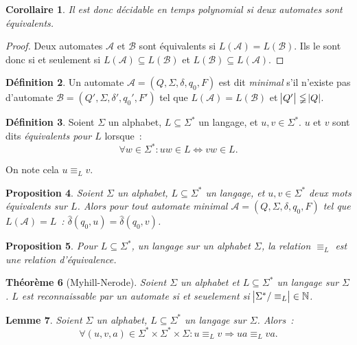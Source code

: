 \documentclass{article}
\newtheorem{thm}{Théorème}[section]
\newtheorem{prp}[thm]{Proposition}
\newtheorem{cor}[thm]{Corollaire}
\newtheorem{lem}[thm]{Lemme}
\theoremstyle{definition}
\newtheorem{déf}[thm]{Définition}
\theoremstyle{remark}
\newcommand{\N}{\mathbb N}
\newcommand{\automaton}{(Q, \Sigma, \delta, q_0, F)}
\begin{document}
	\begin{cor} Il est donc décidable en temps polynomial si deux automates sont équivalents.
	\end{cor}

	\begin{proof} Deux automates $\mathcal A$ et $\mathcal B$ sont équivalents si $L(\mathcal A) = L(\mathcal B)$. Ils le sont donc si et seulement si
	$L(\mathcal A) \subseteq L(\mathcal B)$ et $L(\mathcal B) \subseteq L(\mathcal A)$.
	\end{proof}

	\begin{déf} Un automate $\mathcal A = \automaton$ est dit \textit{minimal} s'il n'existe pas d'automate $\mathcal B = (Q', \Sigma, \delta', q_0', F')$
	tel que $L(\mathcal A) = L(\mathcal B)$ et $\abs {Q'} \lneqq \abs Q$.
	\end{déf}

	\begin{déf} Soient $\Sigma$ un alphabet, $L \subseteq \Sigma^*$ un langage, et $u, v \in \Sigma^*$. $u$ et $v$ sont dits \textit{équivalents pour $L$}
	lorsque~:
	\[\forall w \in \Sigma^* : uw \in L \iff vw \in L.\]

	On note cela $u \equiv_L v$.
	\end{déf}

	\begin{prp} Soient $\Sigma$ un alphabet, $L \subseteq \Sigma^*$ un langage, et $u, v \in \Sigma^*$ deux mots équivalents sur $L$.
	Alors pour tout automate minimal $\mathcal A = \automaton$ tel que $L(\mathcal A) = L$~: $\hat \delta(q_0, u) = \hat \delta(q_0, v)$.
	\end{prp}

	\begin{prp} Pour $L \subseteq \Sigma^*$, un langage sur un alphabet $\Sigma$, la relation $\equiv_L$ est une relation d'équivalence.
	\end{prp}

	\begin{thm}[Myhill-Nerode] Soient $\Sigma$ un alphabet et $L \subseteq \Sigma^*$ un langage sur $\Sigma$. $L$ est reconnaissable par un automate si et
	seuelement si $\abs {\Sigma^* / \equiv_L} \in \N$.
	\end{thm}

	\begin{lem}\label{lem:mots équivalents -> concaténations équivalentes} Soient $\Sigma$ un alphabet, $L \subseteq \Sigma^*$ un langage sur $\Sigma$. Alors~:
	\[\forall (u, v, a) \in \Sigma^* \times \Sigma^* \times \Sigma : u \equiv_L v \Rightarrow ua \equiv_L va.\]
	\end{lem}
\end{document}
